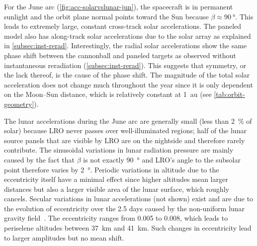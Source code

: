 For the June arc (\cref{fig:acc-solarvslunar-jun}), the spacecraft is in permanent sunlight and the orbit plane normal points toward the Sun because $\beta \approx \qty{90}{\degree}$. This leads to extremely large, constant cross-track solar accelerations. The paneled model also has along-track solar accelerations due to the solar array as explained in \cref{subsec:inst-rerad}. Interestingly, the radial solar accelerations show the same phase shift between the cannonball and paneled targets as observed without instantaneous reradiation (\cref{subsec:inst-rerad}). This suggests that symmetry, or the lack thereof, is the cause of the phase shift. The magnitude of the total solar acceleration does not change much throughout the year since it is only dependent on the Moon--Sun distance, which is relatively constant at \qty{1}{\astronomicalunit} (see \cref{tab:orbit-geometry}).

The lunar accelerations during the June arc are generally small (less than \qty{2}{\percent} of solar) because \gls{LRO} never passes over well-illuminated regions; half of the lunar source panels that are visible by \gls{LRO} are on the nightside and therefore rarely contribute. The sinusoidal variations in lunar radiation pressure are mainly caused by the fact that $\beta$ is not exactly \qty{90}{\degree} and \gls{LRO}'s angle to the subsolar point therefore varies by \qty{2}{\degree}. Periodic variations in altitude due to the eccentricity itself have a minimal effect since higher altitudes mean larger distances but also a larger visible area of the lunar surface, which roughly cancels. Secular variations in lunar accelerations (not shown) exist and are due to the evolution of eccentricity over the 2.5 days caused by the non-uniform lunar gravity field~\cite{Tooley2010}. The eccentricity ranges from 0.005 to 0.008, which leads to periselene altitudes between \qty{37}{\km} and \qty{41}{\km}. Such changes in eccentricity lead to larger amplitudes but no mean shift.


